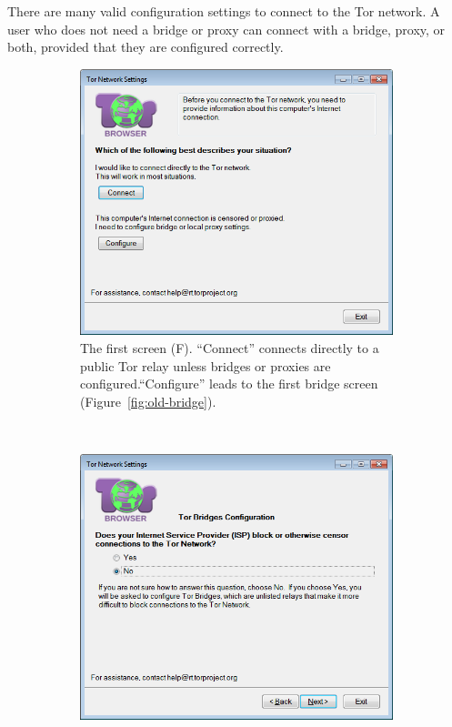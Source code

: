 \documentclass[USenglish,oneside,twocolumn]{article}
\begin{document}
There are many valid configuration settings to connect to the Tor network.
A user who does not need a bridge or proxy can connect with a bridge, proxy, or both, provided that they are configured correctly. 

\begin{figure}
\centering
\begin{subfigure}[b]{0.30\textwidth}
	\includegraphics[width=\textwidth]{screenshots/OLD-first.png}
	\centering\captionsetup{width=1.5\linewidth}%
	\caption{The first screen (F). ``Connect'' connects directly to a public Tor relay unless bridges or proxies are configured.``Configure'' leads to the first bridge screen (Figure~\ref{fig:old-bridge}). }
	\label{fig:old-first}
\end{subfigure}
~~~~~~~~~~~~~~~~~~~~~~~~~
\begin{subfigure}[b]{0.30\textwidth}
	\includegraphics[width=\textwidth]{screenshots/OLD-bridges.png}

\end{subfigure}
\end{figure}
\end{document}
